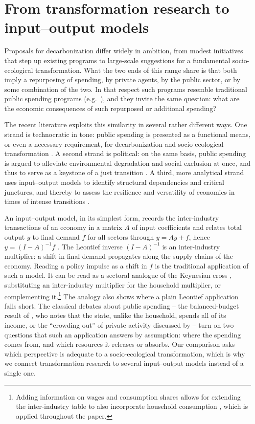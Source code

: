 \section{From transformation research to input--output models}\label{sec:io-bridge}

Proposals for decarbonization differ widely in ambition, from modest initiatives that step up existing programs to large-scale suggestions for a fundamental socio-ecological transformation. What the two ends of this range share is that both imply a repurposing of spending, by private agents, by the public sector, or by some combination of the two. In that respect such programs resemble traditional public spending programs (e.g.\ \citealp{Pollin.2015, Mazzucato.2013}), and they invite the same question: what are the economic consequences of such repurposed or additional spending?

The recent literature exploits this similarity in several rather different ways. One strand is technocratic in tone: public spending is presented as a functional means, or even a necessary requirement, for decarbonization and socio-ecological transformation \citep{Mazzucato.2013, Mazzucato.2018}. A second strand is political: on the same basis, public spending is argued to alleviate environmental degradation and social exclusion at once, and thus to serve as a keystone of a just transition \citep{NewellMulvaney.2013}. A third, more analytical strand uses input--output models to identify structural dependencies and critical junctures, and thereby to assess the resilience and versatility of economies in times of intense transitions \citep{Farmer.2024, BF2019, Acemoglu.2012}. 

An input--output model, in its simplest form, records the inter-industry transactions of an economy in a matrix $A$ of input coefficients and relates total output $y$ to final demand $f$ for all sectors through $y = Ay + f$, hence $y = (I-A)^{-1}f$ \citep{Leontief.1936, leontief1986input, BlairMiller}. The Leontief inverse $(I-A)^{-1}$ is an inter-industry multiplier: a shift in final demand propagates along the supply chains of the economy. Reading a policy impulse as a shift in $f$ is the traditional application of such a model. It can be read as a sectoral analogue of the Keynesian cross \citep{Keynes.1936}, substituting an inter-industry multiplier for the household multiplier, or complementing it.\footnote{Adding information on wages and consumption shares allows for extending the inter-industry table to also incorporate household consumption \citep[ch.~6]{BlairMiller}, which is applied throughout the paper.} The analogy also shows where a plain Leontief application falls short. The classical debates about public spending -- the balanced-budget result of \citet{Haavelmo.1945}, who notes that the state, unlike the household, spends all of its income, or the ``crowding out'' of private activity discussed by \citet{BlinderSolow.1973} -- turn on two questions that such an application answers by assumption: where the spending comes from, and which resources it releases or absorbs. Our comparison asks which perspective is adequate to a socio-ecological transformation, which is why we connect transformation research to several input--output models instead of a single one.

